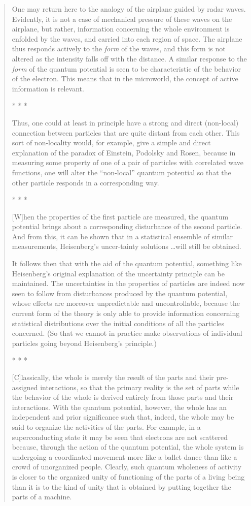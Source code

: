 \documentclass[11pt]{memoir}
\begin{document}
\begin{quote}
One may return here to the analogy of the airplane guided by radar
waves. Evidently, it is not a case of mechanical pressure of these waves
on the airplane, but rather, information concerning the whole
environment is enfolded by the waves, and carried into each region of
space. The airplane thus responds actively to the \emph{form} of the
waves, and this form is not altered as the intensity falls off with the
distance. A similar response to the \emph{form} of the quantum potential
is seen to be characteristic of the behavior of the electron. This means
that in the microworld, the concept of active information is relevant.

\centerline{* * *}

Thus, one could at least in principle have a strong and direct
(non-local) connection between particles that are quite distant from
each other. This sort of non-locality would, for example, give a simple
and direct explanation of the paradox of Einstein, Podolsky and Rosen,
because in measuring some property of one of a pair of particles with
correlated wave functions, one will alter the ``non-local'' quantum
potential so that the other particle responds in a corresponding way.

\centerline{* * *}

{[}W{]}hen the properties of the first particle are measured, the
quantum potential brings about a corresponding disturbance of the second
particle. And from this, it can be shown that in a statistical ensemble
of similar measurements, Heisenberg's uncer-tainty solutions \ldots will
still be obtained.

It follows then that with the aid of the quantum potential, something
like Heisenberg's original explanation of the uncertainty principle can
be maintained. The uncertainties in the properties of particles are
indeed now seen to follow from disturbances produced by the quantum
potential, whose effects are moreover unpredictable and uncontrollable,
because the current form of the theory is only able to provide
information concerning statistical distributions over the initial
conditions of all the particles concerned. (So that we cannot in
practice make observations of individual particles going beyond
Heisenberg's principle.)

\centerline{* * *}

{[}C{]}lassically, the whole is merely the result of the parts and their
pre-assigned interactions, so that the primary reality is the set of
parts while the behavior of the whole is derived entirely from those
parts and their interactions. With the quantum potential, however, the
whole has an independent and prior significance such that, indeed, the
whole may be said to organize the activities of the parts. For example,
in a superconducting state it may be seen that electrons are not
scattered because, through the action of the quantum potential, the
whole system is undergoing a coordinated movement more like a ballet
dance than like a crowd of unorganized people. Clearly, such quantum
wholeness of activity is closer to the organized unity of functioning of
the parts of a living being than it is to the kind of unity that is
obtained by putting together the parts of a machine.
\end{quote}
\end{document}
